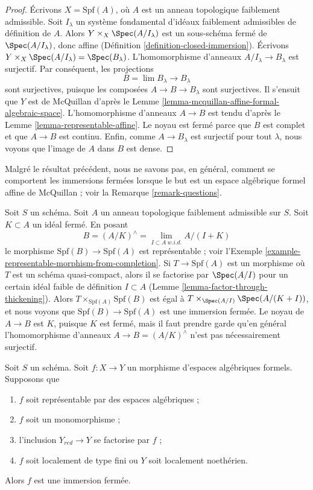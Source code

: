\begin{proof}
Écrivons $X = \text{Spf}(A)$, où $A$ est un anneau topologique faiblement admissible.
Soit $I_\lambda$ un système fondamental d'idéaux faiblement admissibles
de définition de $A$. Alors $Y \times_X \Spec(A/I_\lambda)$ est
un sous-schéma fermé de $\Spec(A/I_\lambda)$,
donc affine (Définition \ref{definition-closed-immersion}).
Écrivons $Y \times_X \Spec(A/I_\lambda) = \Spec(B_\lambda)$.
L'homomorphisme d'anneaux $A/I_\lambda \to B_\lambda$
est surjectif. Par conséquent, les projections
$$
B = \lim B_\lambda \longrightarrow B_\lambda
$$
sont surjectives, puisque les composées $A \to B \to B_\lambda$ sont surjectives.
Il s'ensuit que $Y$ est de McQuillan d'après le
Lemme \ref{lemma-mcquillan-affine-formal-algebraic-space}.
L'homomorphisme d'anneaux $A \to B$ est tendu d'après le Lemme \ref{lemma-representable-affine}.
Le noyau est fermé parce que $B$ est complet et que $A \to B$ est
continu. Enfin, comme $A \to B_\lambda$ est surjectif pour tout $\lambda$,
nous voyons que l'image de $A$ dans $B$ est dense.
\end{proof}

\noindent
Malgré le résultat précédent, nous ne savons pas, en général, comment
se comportent les immersions fermées lorsque le but est un
espace algébrique formel affine de McQuillan ; voir la Remarque \ref{remark-questions}.

\begin{example}
\label{example-closed-immersion-from-quotient}
Soit $S$ un schéma. Soit $A$ un anneau topologique faiblement admissible sur $S$.
Soit $K \subset A$ un idéal fermé. En posant
$$
B = (A/K)^\wedge = \lim_{I \subset A\ w.i.d.} A/(I + K)
$$
le morphisme $\text{Spf}(B) \to \text{Spf}(A)$ est représentable ; voir
l'Exemple \ref{example-representable-morphism-from-completion}.
Si $T \to \text{Spf}(A)$ est un morphisme où $T$ est un schéma
quasi-compact, alors il se factorise par $\Spec(A/I)$ pour un certain idéal faible
de définition $I \subset A$ (Lemme \ref{lemma-factor-through-thickening}).
Alors $T \times_{\text{Spf}(A)} \text{Spf}(B)$
est égal à $T \times_{\Spec(A/I)} \Spec(A/(K + I))$, et
nous voyons que $\text{Spf}(B) \to \text{Spf}(A)$ est une immersion fermée.
Le noyau de $A \to B$ est $K$, puisque $K$ est fermé, mais
il faut prendre garde qu'en général l'homomorphisme d'anneaux $A \to B = (A/K)^\wedge$
n'est pas nécessairement surjectif.
\end{example}

\begin{lemma}
\label{lemma-monomorphism-iso-over-red}
Soit $S$ un schéma. Soit $f : X \to Y$ un morphisme d'espaces algébriques
formels. Supposons que
\begin{enumerate}
\item $f$ soit représentable par des espaces algébriques ;
\item $f$ soit un monomorphisme ;
\item l'inclusion $Y_{red} \to Y$ se factorise par $f$ ;
\item $f$ soit localement de type fini ou $Y$ soit localement noethérien.
\end{enumerate}
Alors $f$ est une immersion fermée.
\end{lemma}

